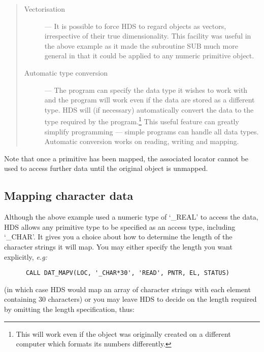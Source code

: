\begin{quote}
\begin{description}

\item [Vectorisation] ---
It is possible to force HDS to regard objects as vectors, irrespective of
their true dimensionality.
This facility was useful in the above example as it made the subroutine SUB
much more general in that it could be applied to any numeric primitive object. 

\item [Automatic type conversion] ---
The program can specify the data type it wishes to work with and the program
will work even if the data are stored as a different type.
HDS will (if necessary) automatically convert the data to the type required by
the program.\footnote{This will work even if the object was originally created
on a different computer which formats its numbers differently.}
This useful feature can greatly simplify programming --- simple programs can
handle all data types.
Automatic conversion works on reading, writing and mapping. 

\end{description}
\end{quote}

Note that once a primitive has been mapped, the associated locator cannot be
used to access further data until the original object is unmapped.

\subsection{Mapping character data}
\label{S_charmapping}

Although the above example used a numeric type of `\_REAL' to access the data,
HDS allows any primitive type to be specified as an access type, including
`\_CHAR'.
It gives you a choice about how to determine the length of the character
strings it will map.
You may either specify the length you want explicitly, {\em e.g:}

\begin{small}
\begin{verbatim}
      CALL DAT_MAPV(LOC, '_CHAR*30', 'READ', PNTR, EL, STATUS)
\end{verbatim}
\end{small}


(in which case HDS would map an array of character strings with each element 
containing 30 characters) or you may leave HDS to decide on the length
required by omitting the length specification, thus:

